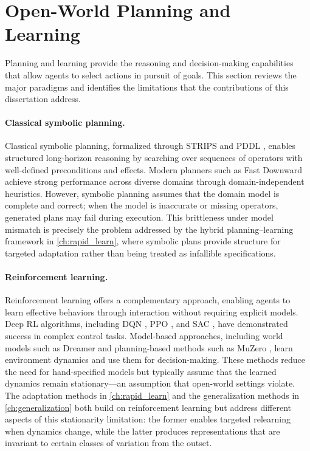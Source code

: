 \section{Open-World Planning and Learning}
\label{sec:rw_planning_learning}
\label{sec:open_world_planning_learning}

Planning and learning provide the reasoning and decision-making capabilities that allow agents to select actions in pursuit of goals. This section reviews the major paradigms and identifies the limitations that the contributions of this dissertation address.

\paragraph{Classical symbolic planning.}
Classical symbolic planning, formalized through STRIPS \citep{fikes1971strips} and PDDL \citep{mcdermott1998pddl}, enables structured long-horizon reasoning by searching over sequences of operators with well-defined preconditions and effects. Modern planners such as Fast Downward \citep{helmert2006fast} achieve strong performance across diverse domains through domain-independent heuristics. However, symbolic planning assumes that the domain model is complete and correct; when the model is inaccurate or missing operators, generated plans may fail during execution. This brittleness under model mismatch is precisely the problem addressed by the hybrid planning--learning framework in \cref{ch:rapid_learn}, where symbolic plans provide structure for targeted adaptation rather than being treated as infallible specifications.

\paragraph{Reinforcement learning.}
Reinforcement learning offers a complementary approach, enabling agents to learn effective behaviors through interaction without requiring explicit models. Deep RL algorithms, including DQN \citep{mnih2015human}, PPO \citep{schulman2017proximal}, and SAC \citep{haarnoja2018soft}, have demonstrated success in complex control tasks. Model-based approaches, including world models such as Dreamer \citep{hafner2023mastering} and planning-based methods such as MuZero \citep{schrittwieser2020mastering}, learn environment dynamics and use them for decision-making. These methods reduce the need for hand-specified models but typically assume that the learned dynamics remain stationary---an assumption that open-world settings violate. The adaptation methods in \cref{ch:rapid_learn} and the generalization methods in \cref{ch:generalization} both build on reinforcement learning but address different aspects of this stationarity limitation: the former enables targeted relearning when dynamics change, while the latter produces representations that are invariant to certain classes of variation from the outset.

